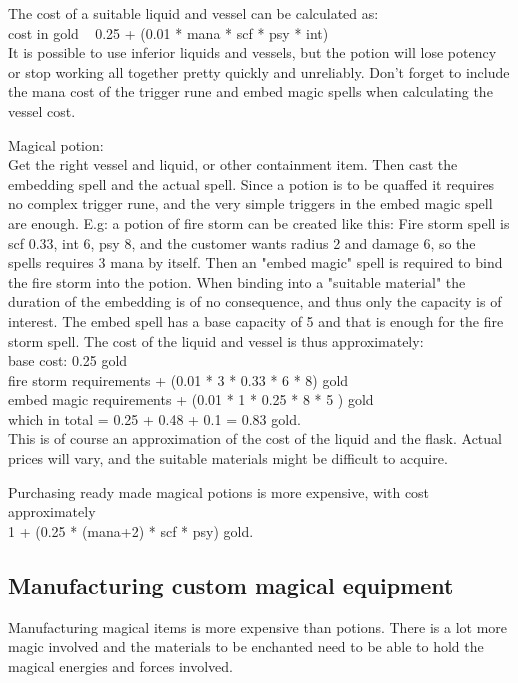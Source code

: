 The cost of a suitable liquid and vessel can be calculated as: \\
cost in gold ~ 0.25 + (0.01 * mana * scf * psy * int) \\
It is possible to use inferior liquids and vessels, but the potion will lose potency or stop working all together pretty quickly and unreliably.
Don't forget to include the mana cost of the trigger rune and embed magic spells when calculating the vessel cost.

Magical potion: \\
Get the right vessel and liquid, or other containment item.
Then cast the embedding spell and the actual spell. Since a potion is to be quaffed it requires no complex trigger rune, and the very simple triggers in the embed magic spell are enough.
E.g: a potion of fire storm can be created like this:
Fire storm spell is scf 0.33, int 6, psy 8, and the customer wants radius 2 and damage 6, so the spells requires 3 mana by itself. Then an "embed magic" spell is required to bind the fire storm into the potion. When binding into a "suitable material" the duration of the embedding is of no consequence, and thus only the capacity is of interest. The embed spell has a base capacity of 5 and that is enough for the fire storm spell.
The cost of the liquid and vessel is thus approximately:\\
base cost: 0.25 gold \\
fire storm requirements + (0.01 * 3 * 0.33 * 6 * 8) gold \\
embed magic requirements + (0.01 * 1 * 0.25 * 8 * 5 ) gold \\
which in total = 0.25 + 0.48 + 0.1 = 0.83 gold. \\
This is of course an approximation of the cost of the liquid and the flask. Actual prices will vary, and the suitable materials might be difficult to acquire.

Purchasing ready made magical potions is more expensive, with cost approximately \\ 1 + (0.25 * (mana+2) * scf * psy) gold.


\subsection*{Manufacturing custom magical equipment}
Manufacturing magical items is more expensive than potions. There is a lot more magic involved and the materials to be enchanted need to be able to hold the magical energies and forces involved.

